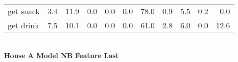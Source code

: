 \documentclass{article}
\begin{document}
\begin{sideways}
\begin{tabular}{lrrrrrrrrrr}
get snack         &         3.4 &               11.9 &               0.0 &                0.0 &                0.0 &             78.0 &                      0.9 &                   5.5 &              0.2 &              0.0 \\
get drink         &         7.5 &               10.1 &               0.0 &                0.0 &                0.0 &             61.0 &                      2.8 &                   6.0 &              0.0 &             12.6 \\
\bottomrule
\end{tabular}
\end{sideways}
\normalsize
\vspace{1cm}\\
\textbf{House A Model NB Feature Last}\\
\vspace{1cm}\\
\end{document}
